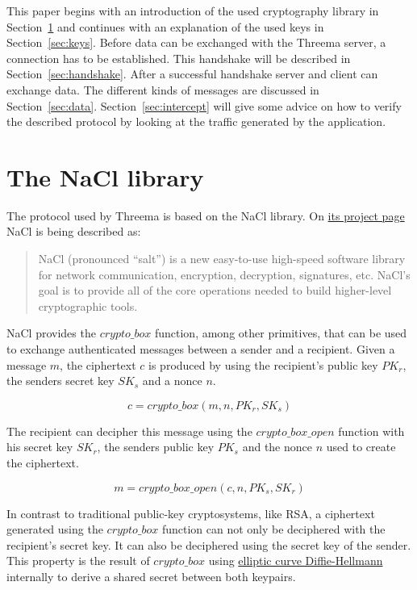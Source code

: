 \documentclass[11pt,a4paper,bookmarksopen=true]{article}
\begin{document}
This paper begins with an introduction of the used cryptography
library in Section~\ref{sec:nacl} and continues with an explanation of
the used keys in Section~\ref{sec:keys}. Before data can be
exchanged with the Threema server, a connection has to be
established. This handshake will be described in
Section~\ref{sec:handshake}.
After a successful handshake server and
client can exchange data. The different kinds of messages are
discussed in Section~\ref{sec:data}.
Section~\ref{sec:intercept} will give
some advice on how to verify the described protocol by
looking at the traffic generated by the application.

\section{The NaCl library}\label{sec:nacl}
The protocol used by Threema is based on the NaCl library. On
\href{http://nacl.cr.yp.to/}{its project page} NaCl is being described
as:

\begin{quote}
  NaCl (pronounced ``salt'') is a new easy-to-use high-speed software library for network communication, encryption, decryption, signatures, etc. NaCl's goal is to provide all of the core operations needed to build higher-level cryptographic tools.
\end{quote}

NaCl provides the
$\mathit{crypto\_box}$ function, among other primitives, that can be used to exchange
authenticated messages between a sender and a recipient. Given a
message $m$, the ciphertext $c$ is produced by using the recipient's
public key $PK_r$, the senders secret key $SK_s$ and a
nonce $n$.

\begin{equation}
 c = \mathit{crypto\_box}(m, n, \mathit{PK}_r, \mathit{SK}_s)
\end{equation}

The recipient can decipher this message using the
$\mathit{crypto\_box\_open}$ function with his secret key $\mathit{SK}_r$,
the senders public key $\mathit{PK}_s$ and the nonce $n$ used to create the ciphertext.

\begin{equation}
m = \mathit{crypto\_box\_open}(c, n, \mathit{PK}_s, \mathit{SK}_r)
\end{equation}

In contrast to traditional public-key cryptosystems, like RSA, a
ciphertext generated using the $\mathit{crypto\_box}$ function can not
only be deciphered with the recipient's secret key. It can also be
deciphered using the secret key of the sender.  This property is the
result of $\mathit{crypto\_box}$ using \href{https://en.wikipedia.org/wiki/ECDH}{elliptic
  curve Diffie-Hellmann} internally to derive a shared secret between both keypairs.
\end{document}
